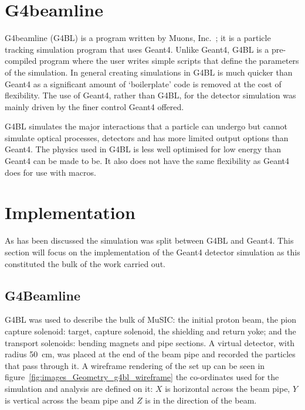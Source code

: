 \section{G4beamline} %
\label{sec:g4beamline}
G4beamline (G4BL) is a program written by Muons, Inc.~\cite{g4bl}; it is a particle tracking simulation program that uses Geant4. Unlike Geant4, G4BL is a pre-compiled program where the user writes simple scripts that define the parameters of the simulation. In general creating simulations in G4BL is much quicker than Geant4 as a significant amount of `boilerplate' code is removed at the cost of flexibility. The use of Geant4, rather than G4BL, for the detector simulation was mainly driven by the finer control Geant4 offered.

G4BL simulates the major interactions that a particle can undergo but cannot simulate optical processes, detectors and has more limited output options than Geant4. The physics used in G4BL is less well optimised for low energy than Geant4 can be made to be. It also does not have the same flexibility as Geant4 does for use with macros.

\section{Implementation} %
\label{cha:implementation}
As has been discussed the simulation was split between G4BL and Geant4. This section will focus on the implementation of the Geant4 detector simulation as this constituted the bulk of the work carried out.

\subsection{G4Beamline} %
\label{sec:g4beamline_impl}
G4BL was used to describe the bulk of MuSIC: the initial proton beam, the pion capture solenoid: target, capture solenoid, the shielding and return yoke; and the transport solenoids: bending magnets and pipe sections. A virtual detector, with radius 50~cm, was placed at the end of the beam pipe and recorded the particles that pass through it. A wireframe rendering of the set up can be seen in figure~\ref{fig:images_Geometry_g4bl_wireframe} the co-ordinates used for the simulation and analysis are defined on it: \(X\) is horizontal across the beam pipe, \(Y\) is vertical across the beam pipe and \(Z\) is in the direction of the beam.

